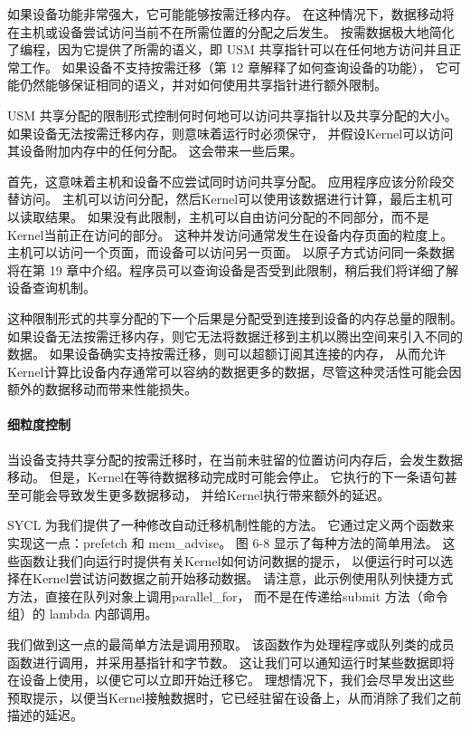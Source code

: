 如果设备功能非常强大，它可能能够按需迁移内存。 
在这种情况下，数据移动将在主机或设备尝试访问当前不在所需位置的分配之后发生。 
按需数据极大地简化了编程，因为它提供了所需的语义，即 USM 共享指针可以在任何地方访问并且正常工作。 
如果设备不支持按需迁移（第 12 章解释了如何查询设备的功能），
它可能仍然能够保证相同的语义，并对如何使用共享指针进行额外限制。

USM 共享分配的限制形式控制何时何地可以访问共享指针以及共享分配的大小。 
如果设备无法按需迁移内存，则意味着运行时必须保守，
并假设Kernel可以访问其设备附加内存中的任何分配。 这会带来一些后果。

首先，这意味着主机和设备不应尝试同时访问共享分配。 应用程序应该分阶段交替访问。 
主机可以访问分配，然后Kernel可以使用该数据进行计算，最后主机可以读取结果。 
如果没有此限制，主机可以自由访问分配的不同部分，而不是Kernel当前正在访问的部分。 
这种并发访问通常发生在设备内存页面的粒度上。 主机可以访问一个页面，而设备可以访问另一页面。 
以原子方式访问同一条数据将在第 19 章中介绍。程序员可以查询设备是否受到此限制，稍后我们将详细了解设备查询机制。

这种限制形式的共享分配的下一个后果是分配受到连接到设备的内存总量的限制。 
如果设备无法按需迁移内存，则它无法将数据迁移到主机以腾出空间来引入不同的数据。 
如果设备确实支持按需迁移，则可以超额订阅其连接的内存，
从而允许Kernel计算比设备内存通常可以容纳的数据更多的数据，尽管这种灵活性可能会因额外的数据移动而带来性能损失。

\paragraph{细粒度控制}

当设备支持共享分配的按需迁移时，在当前未驻留的位置访问内存后，会发生数据移动。 
但是，Kernel在等待数据移动完成时可能会停止。 它执行的下一条语句甚至可能会导致发生更多数据移动，
并给Kernel执行带来额外的延迟。

SYCL 为我们提供了一种修改自动迁移机制性能的方法。 它通过定义两个函数来实现这一点：prefetch 和 mem\_advise。 
图 6-8 显示了每种方法的简单用法。 这些函数让我们向运行时提供有关Kernel如何访问数据的提示，
以便运行时可以选择在Kernel尝试访问数据之前开始移动数据。 
请注意，此示例使用队列快捷方式方法，直接在队列对象上调用parallel\_for，
而不是在传递给submit 方法（命令组）的 lambda 内部调用。

我们做到这一点的最简单方法是调用预取。 该函数作为处理程序或队列类的成员函数进行调用，并采用基指针和字节数。 
这让我们可以通知运行时某些数据即将在设备上使用，以便它可以立即开始迁移它。 
理想情况下，我们会尽早发出这些预取提示，以便当Kernel接触数据时，它已经驻留在设备上，从而消除了我们之前描述的延迟。

